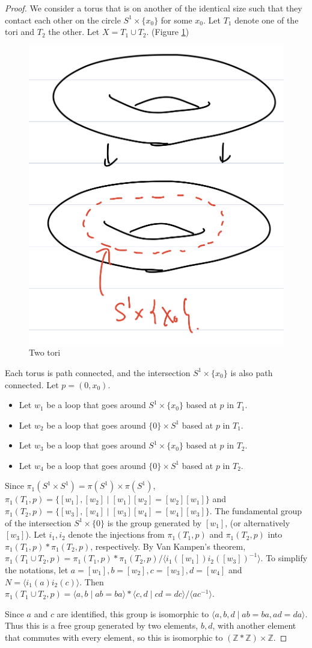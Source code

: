 \documentclass[12pt, psamsfonts]{amsart}
\theoremstyle{definition}
\theoremstyle{remark}
\numberwithin{equation}{section}
\begin{document}
\begin{proof}
  We consider a torus that is on another of the identical size such that they contact each other on the circle $S^1 \times \{ x_0 \}$ for some $x_0$.
  Let $T_1$ denote one of the tori and $T_2$ the other.
  Let $X = T_1 \cup T_2$.
  (Figure \ref{fig:tori})
  \begin{figure}
    \includegraphics[width=.5\linewidth]{two-tori.jpeg}
      \caption{Two tori}
    \label{fig:tori}
  \end{figure}
  Each torus is path connected, and the intersection $S^1 \times \{ x_0 \}$ is also path connected.
  Let $p = (0, x_0)$.
  \begin{itemize}
    \item
      Let $w_1$ be a loop that goes around $S^1 \times \{ x_0 \}$ based at $p$ in $T_1$.
    \item
      Let $w_2$ be a loop that goes around $\{ 0 \} \times S^1$ based at $p$ in $T_1$.
    \item
      Let $w_3$ be a loop that goes around $S^1 \times \{ x_0 \}$ based at $p$ in $T_2$.
    \item
      Let $w_4$ be a loop that goes around $\{ 0 \} \times S^1$ based at $p$ in $T_2$.
  \end{itemize}
  Since $\pi_1(S^1 \times S^1) = \pi(S^1) \times \pi(S^1)$, $\pi_1(T_1, p) = \{ [w_1], [w_2] \mid [w_1][w_2] = [w_2][w_1]\}$ and $\pi_1(T_2, p) = \{ [w_3], [w_4] \mid [w_3][w_4] = [w_4][w_3]\}$.
  The fundamental group of the intersection $S^1 \times \{ 0 \}$ is the group generated by $[w_1]$, (or alternatively $[w_3]$).
  Let $i_1, i_2$ denote the injections from $\pi_1(T_1, p)$ and $\pi_1(T_2, p)$ into $\pi_1(T_1, p) * \pi_1(T_2, p)$, respectively.
  By Van Kampen's theorem, $\pi_1(T_1 \cup T_2, p) = \pi_1(T_1, p) * \pi_1(T_2, p) / \langle i_1([w_1])i_2([w_3])^{-1} \rangle$.
  To simplify the notations, let $a = [w_1], b = [w_2], c = [w_3], d = [w_4]$ and $N = \langle i_1(a)i_2(c) \rangle$.
  Then $\pi_1(T_1 \cup T_2, p) = \langle a, b \mid ab = ba \rangle * \langle c, d \mid cd = dc \rangle / \langle ac^{-1} \rangle$.

  Since $a$ and $c$ are identified, this group is isomorphic to $\langle a, b, d \mid ab = ba, ad = da \rangle$.
  Thus this is a free group generated by two elements, $b, d$, with another element that commutes with every element, so this is isomorphic to $(\mathbb{Z} * \mathbb{Z}) \times \mathbb{Z}$.
\end{proof}
\end{document}
